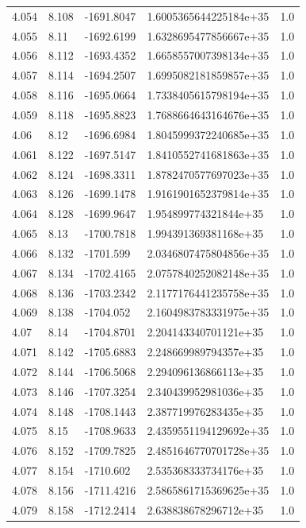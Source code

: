 \begin{tabular}{lllll}
4.054 & 8.108 & -1691.8047 & 1.6005365644225184e+35 & 1.0 \\
4.055 & 8.11 & -1692.6199 & 1.6328695477856667e+35 & 1.0 \\
4.056 & 8.112 & -1693.4352 & 1.6658557007398134e+35 & 1.0 \\
4.057 & 8.114 & -1694.2507 & 1.6995082181859857e+35 & 1.0 \\
4.058 & 8.116 & -1695.0664 & 1.7338405615798194e+35 & 1.0 \\
4.059 & 8.118 & -1695.8823 & 1.7688664643164676e+35 & 1.0 \\
4.06 & 8.12 & -1696.6984 & 1.8045999372240685e+35 & 1.0 \\
4.061 & 8.122 & -1697.5147 & 1.8410552741681863e+35 & 1.0 \\
4.062 & 8.124 & -1698.3311 & 1.8782470577697023e+35 & 1.0 \\
4.063 & 8.126 & -1699.1478 & 1.9161901652379814e+35 & 1.0 \\
4.064 & 8.128 & -1699.9647 & 1.954899774321844e+35 & 1.0 \\
4.065 & 8.13 & -1700.7818 & 1.994391369381168e+35 & 1.0 \\
4.066 & 8.132 & -1701.599 & 2.0346807475804856e+35 & 1.0 \\
4.067 & 8.134 & -1702.4165 & 2.0757840252082148e+35 & 1.0 \\
4.068 & 8.136 & -1703.2342 & 2.1177176441235758e+35 & 1.0 \\
4.069 & 8.138 & -1704.052 & 2.1604983783331975e+35 & 1.0 \\
4.07 & 8.14 & -1704.8701 & 2.204143340701121e+35 & 1.0 \\
4.071 & 8.142 & -1705.6883 & 2.248669989794357e+35 & 1.0 \\
4.072 & 8.144 & -1706.5068 & 2.294096136866113e+35 & 1.0 \\
4.073 & 8.146 & -1707.3254 & 2.340439952981036e+35 & 1.0 \\
4.074 & 8.148 & -1708.1443 & 2.387719976283435e+35 & 1.0 \\
4.075 & 8.15 & -1708.9633 & 2.4359551194129692e+35 & 1.0 \\
4.076 & 8.152 & -1709.7825 & 2.4851646770701728e+35 & 1.0 \\
4.077 & 8.154 & -1710.602 & 2.535368333734176e+35 & 1.0 \\
4.078 & 8.156 & -1711.4216 & 2.5865861715369625e+35 & 1.0 \\
4.079 & 8.158 & -1712.2414 & 2.638838678296712e+35 & 1.0 \\

\end{tabular}
